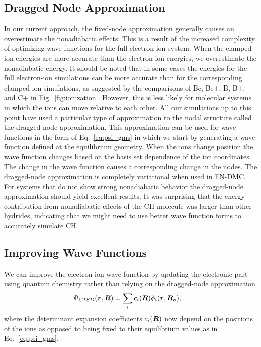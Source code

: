 \subsection{Dragged Node Approximation}
In our current approach, the fixed-node approximation generally causes an overestimate the nonadiabatic effects. This is a result of the increased complexity of optimizing wave functions for the full electron-ion system. When the clamped-ion energies are more accurate than the electron-ion energies, we overestimate the nonadiabatic energy. It should be noted that in some cases the energies for the full electron-ion simulations can be more accurate than for the corresponding clamped-ion simulations, as suggested by the comparisons of Be, Be+, B, B+, and C+ in Fig.~\ref{fig:ionization}.
However, this is less likely for molecular systems in which the ions can move relative to each other.
All our simulations up to this point have used a particular type of approximation to the nodal structure called the dragged-node approximation.
This approximation can be used for wave functions in the form of Eq.~\ref{eq:psi_gms} in which we start by generating a wave function defined at the equilibrium geometry.
When the ions change position the wave function changes based on the basis set dependence of the ion coordinates.
The change in the wave function causes a corresponding change in the nodes.
The dragged-node approximation is completely variational when used in FN-DMC.
For systems that do not show strong nonadiabatic behavior the dragged-node approximation should yield excellent results.
It was surprising that the energy contribution from nonadiabatic effects of the CH molecule was larger than other hydrides, indicating that we might need to use better wave function forms to accurately simulate CH.

\subsection{Improving Wave Functions}
We can improve the electron-ion wave function by updating the electronic part using quantum chemistry rather than relying on the dragged-node approximation
\begin{align}
\Psi_{CISD}(\boldsymbol{r},\boldsymbol{R}) &= \sum_i c_i(\boldsymbol{R}) \phi_i(\boldsymbol{r},\boldsymbol{R}_o), \label{eq:nonbo-best-psi}
\end{align}
where the determinant expansion coefficients $c_i(\boldsymbol{R})$ now depend on the positions of the ions as opposed to being fixed to their equilibrium values as in Eq.~\ref{eq:psi_gms}.

